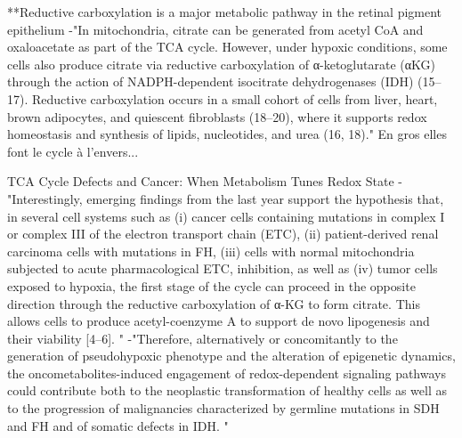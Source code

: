 \documentclass[11pt,a4paper]{article}
\begin{document}
**Reductive carboxylation is a major metabolic pathway in the retinal pigment epithelium
-"In mitochondria, citrate can be generated from acetyl CoA and oxaloacetate as part of the TCA cycle. However, under hypoxic conditions, some cells also produce citrate via reductive carboxylation of α-ketoglutarate (αKG) through the action of NADPH-dependent isocitrate dehydrogenases (IDH) (15–17). Reductive carboxylation occurs in a small cohort of cells from liver, heart, brown adipocytes, and quiescent fibroblasts (18–20), where it supports redox homeostasis and synthesis of lipids, nucleotides, and urea (16, 18)."  En gros elles font le cycle à l'envers...

TCA Cycle Defects and Cancer: When Metabolism Tunes Redox State
-"Interestingly, emerging findings from the last year support the hypothesis that, in several cell systems such as (i) cancer cells containing mutations in complex I or complex III of the electron transport chain (ETC), (ii) patient-derived renal carcinoma cells with mutations in FH, (iii) cells with normal mitochondria subjected to acute pharmacological ETC, inhibition, as well as (iv) tumor cells exposed to hypoxia, the first stage of the cycle can proceed in the opposite direction through the reductive carboxylation of α-KG to form citrate. This allows cells to produce acetyl-coenzyme A to support de novo lipogenesis and their viability [4–6]. "
-"Therefore, alternatively or concomitantly to the generation of pseudohypoxic phenotype and the alteration of epigenetic dynamics, the oncometabolites-induced engagement of redox-dependent signaling pathways could contribute both to the neoplastic transformation of healthy cells as well as to the progression of malignancies characterized by germline mutations in SDH and FH and of somatic defects in IDH. "
\end{document}
